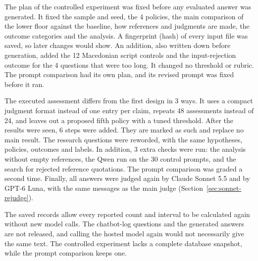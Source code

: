 The plan of the controlled experiment was fixed before any evaluated answer was generated. It fixed the sample and seed, the 4 policies, the main comparison of the lower floor against the baseline, how references and judgments are made, the outcome categories and the analysis. A fingerprint (hash) of every input file was saved, so later changes would show. An addition, also written down before generation, added the 12 Macedonian script controls and the input-rejection outcome for the 4 questions that were too long. It changed no threshold or rubric. The prompt comparison had its own plan, and its revised prompt was fixed before it ran.

The executed assessment differs from the first design in 3 ways. It uses a compact judgment format instead of one entry per claim, repeats 48 assessments instead of 24, and leaves out a proposed fifth policy with a tuned threshold. After the results were seen, 6 steps were added. They are marked as such and replace no main result. The research questions were reworded, with the same hypotheses, policies, outcomes and labels. In addition, 3 extra checks were run: the analysis without empty references, the Qwen run on the 30 control prompts, and the search for rejected reference quotations. The prompt comparison was graded a second time. Finally, all answers were judged again by Claude Sonnet 5.5 and by GPT-6 Luna, with the same messages as the main judge (Section~\ref{sec:sonnet-rejudge}).

The saved records allow every reported count and interval to be calculated again without new model calls. The chatbot-log questions and the generated answers are not released, and calling the hosted model again would not necessarily give the same text. The controlled experiment lacks a complete database snapshot, while the prompt comparison keeps one.

